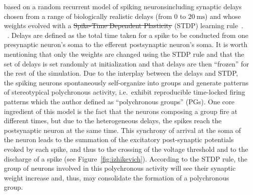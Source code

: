 \documentclass[brainsci, %
               review,accept,pdftex,moreauthors %
               ]{Definitions/mdpi}
\newcommand{\ms}{\si{\milli\second}}%
\providecommand{\DIFadd}[1]{{\protect\color{blue}\uwave{#1}}} %
\providecommand{\DIFdel}[1]{{\protect\color{red}\sout{#1}}}                      %
\providecommand{\DIFaddbegin}{} %
\providecommand{\DIFaddend}{} %
\providecommand{\DIFdelbegin}{} %
\providecommand{\DIFdelend}{} %
\newcommand{\DIFscaledelfig}{0.5}
\newlength{\DIFdelgraphicswidth} %
\newlength{\DIFdelgraphicsheight} %
\newcommand{\DIFaddincludegraphics}[2][]{{\color{blue}\fbox{\DIFOincludegraphics[#1]{#2}}}} %
\newcommand{\DIFdelincludegraphics}[2][]{%
\sbox{\DIFdelgraphicsbox}{\DIFOincludegraphics[#1]{#2}}%
\settoboxwidth{\DIFdelgraphicswidth}{\DIFdelgraphicsbox} %
\settoboxtotalheight{\DIFdelgraphicsheight}{\DIFdelgraphicsbox} %
\scalebox{\DIFscaledelfig}{%
\parbox[b]{\DIFdelgraphicswidth}{\usebox{\DIFdelgraphicsbox}\\[-\baselineskip] \rule{\DIFdelgraphicswidth}{0em}}\llap{\resizebox{\DIFdelgraphicswidth}{\DIFdelgraphicsheight}{%
\setlength{\unitlength}{\DIFdelgraphicswidth}%
\begin{picture}(1,1)%
\thicklines\linethickness{2pt} %
{\color[rgb]{1,0,0}\put(0,0){\framebox(1,1){}}}%
{\color[rgb]{1,0,0}\put(0,0){\line( 1,1){1}}}%
{\color[rgb]{1,0,0}\put(0,1){\line(1,-1){1}}}%
\end{picture}%
}\hspace*{3pt}}} %
} %
\DeclareRobustCommand{\DIFaddbegin}{\DIFOaddbegin \let\includegraphics\DIFaddincludegraphics} %
\DeclareRobustCommand{\DIFaddend}{\DIFOaddend \let\includegraphics\DIFOincludegraphics} %
\DeclareRobustCommand{\DIFdelbegin}{\DIFOdelbegin \let\includegraphics\DIFdelincludegraphics} %
\DeclareRobustCommand{\DIFdelend}{\DIFOaddend \let\includegraphics\DIFOincludegraphics} %
\begin{document}
\DIFdelend \DIFaddbegin {} \DIFaddend based on a random recurrent model of spiking neurons\DIFaddbegin \DIFadd{, }\DIFaddend including synaptic delays chosen from a range of biologically realistic delays (from $0$ to $20~\ms$) and whose weights evolved with a \DIFdelbegin \DIFdel{Spike-Time Dependent Plasticity }\DIFdelend \DIFaddbegin \DIFadd{spike-time-dependent plasticity }\DIFaddend (STDP) learning rule~\citep{markram_regulation_1997}. ~\citep{caporale_spike_2008}. Delays are defined as the total time taken for a spike to be conducted from one presynaptic neuron's soma to the efferent postsynaptic neuron's soma. It is worth mentioning that only the weights are changed using the STDP rule and that the set of delays is set randomly at initialization and that delays are then ``frozen'' for the rest of the simulation. Due to the interplay between the delays and STDP, the spiking neurons spontaneously self-organize into groups and generate patterns of stereotypical polychronous activity, i.e.\DIFaddbegin \DIFadd{,}\DIFaddend ~exhibit reproducible time-locked firing patterns which  the author defined as ``polychronous groups'' (PGs). One core ingredient of this model is the fact that the neurons composing a group fire at different times, but due to the heterogeneous delays, the spikes reach the postsynaptic neuron at the same time. This synchrony of arrival at the soma of the neuron leads to the summation of the excitatory post-synaptic potentials evoked by each spike, and thus to the crossing of the voltage threshold and to the discharge of a spike (see Figure~\ref{fig:izhikevich}). According to the STDP rule, the group of neurons involved in this polychronous activity will see their synaptic weight increase and, thus, may consolidate the formation of a polychronous group. 

\DIFaddbegin 
\end{document}
